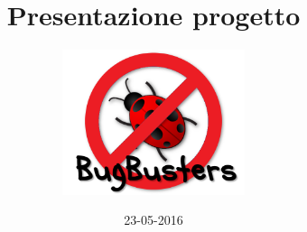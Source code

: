 \documentclass[]{beamer}
\title{Presentazione progetto}
\author[BugBusters]{\includegraphics[width=0.4\textwidth]{logo.png}}
\date{23-05-2016}
\institute{Progetto MaaS}
\begin{document}
\graphicspath{ {res/img/} }



\end{document}
